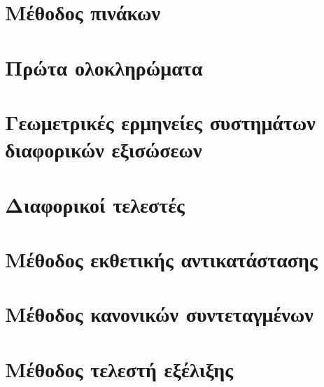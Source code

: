 \documentclass[11pt,a4paper,twoside]{book}
\begin{document}
\section{Μέθοδος πινάκων}
\section{Πρώτα ολοκληρώματα}
\section{Γεωμετρικές ερμηνείες συστημάτων διαφορικών εξισώσεων}
\section{Διαφορικοί τελεστές}
\section{Μέθοδος εκθετικής αντικατάστασης}
\section{Μέθοδος κανονικών συντεταγμένων}
\section{Μέθοδος τελεστή εξέλιξης}
\end{document}
